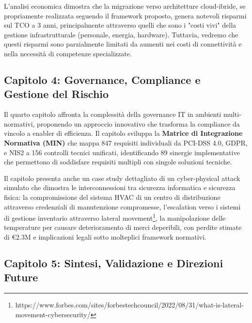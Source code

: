 L'analisi economica dimostra che la migrazione verso architetture cloud-ibride, se propriamente realizzata seguendo il framework proposto, genera notevoli risparmi sul TCO a 3 anni, principalmente attraverso quelli che sono i "costi vivi" della gestione infrastrutturale (personale, energia, hardware). Tuttavia, vedremo che questi risparmi sono parzialmente limitati da aumenti nei costi di connettività e nella necessità di competenze specializzate.

\subsection{Capitolo 4: Governance, Compliance e Gestione del Rischio}

\label{ssec:struttura_cap4}
Il quarto capitolo affronta la complessità della governance IT in ambienti multi-normativi, proponendo un approccio innovativo che trasforma la compliance da vincolo a enabler di efficienza. Il capitolo sviluppa la \textbf{Matrice di Integrazione Normativa (MIN)} che mappa 847 requisiti individuali da PCI-DSS 4.0, GDPR, e NIS2 a 156 controlli tecnici unificati, identificando 89 sinergie implementative che permettono di soddisfare requisiti multipli con singole soluzioni tecniche.

Il capitolo presenta anche un case study dettagliato di un cyber-physical attack simulato che dimostra le interconnessioni tra sicurezza informatica e sicurezza fisica: la compromissione del sistema HVAC di un centro di distribuzione attraverso credenziali di manutenzione compromesse, l'escalation verso i sistemi di gestione inventario attraverso lateral movement\footnote{https://www.forbes.com/sites/forbestechcouncil/2022/08/31/what-is-lateral-movement-cybersecurity/}, la manipolazione delle temperature per causare deterioramento di merci deperibili, con perdite stimate di €2.3M e implicazioni legali sotto molteplici framework normativi.

\subsection{Capitolo 5: Sintesi, Validazione e Direzioni Future}

\label{ssec:struttura_cap5}


